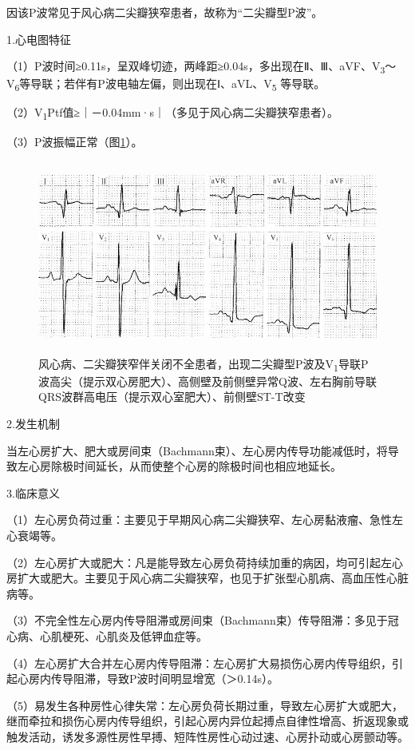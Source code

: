 因该P波常见于风心病二尖瓣狭窄患者，故称为“二尖瓣型P波”。

1.心电图特征

（1）P波时间≥0.11s，呈双峰切迹，两峰距≥0.04s，多出现在Ⅱ、Ⅲ、aVF、V\textsubscript{3}～V\textsubscript{6}等导联；若伴有P波电轴左偏，则出现在Ⅰ、aVL、V\textsubscript{5} 等导联。

（2）V\textsubscript{1}Ptf值≥｜－0.04mm·s｜（多见于风心病二尖瓣狭窄患者）。

（3）P波振幅正常（图\ref{fig1-2}）。

\begin{figure}[!htbp]
 \centering
 \includegraphics[width=5.19792in,height=2.5in]{./images/Image00007.jpg}
 \captionsetup{justification=centering}
 \caption{风心病、二尖瓣狭窄伴关闭不全患者，出现二尖瓣型P波及V\textsubscript{1}导联P波高尖（提示双心房肥大）、高侧壁及前侧壁异常Q波、左右胸前导联QRS波群高电压（提示双心室肥大）、前侧壁ST-T改变}
 \label{fig1-2}
  \end{figure} 


2.发生机制

当左心房扩大、肥大或房间束（Bachmann束）、左心房内传导功能减低时，将导致左心房除极时间延长，从而使整个心房的除极时间也相应地延长。

3.临床意义

（1）左心房负荷过重：主要见于早期风心病二尖瓣狭窄、左心房黏液瘤、急性左心衰竭等。

（2）左心房扩大或肥大：凡是能导致左心房负荷持续加重的病因，均可引起左心房扩大或肥大。主要见于风心病二尖瓣狭窄，也见于扩张型心肌病、高血压性心脏病等。

（3）不完全性左心房内传导阻滞或房间束（Bachmann束）传导阻滞：多见于冠心病、心肌梗死、心肌炎及低钾血症等。

（4）左心房扩大合并左心房内传导阻滞：左心房扩大易损伤心房内传导组织，引起心房内传导阻滞，导致P波时间明显增宽（＞0.14s）。

（5）易发生各种房性心律失常：左心房负荷长期过重，导致左心房扩大或肥大，继而牵拉和损伤心房内传导组织，引起心房内异位起搏点自律性增高、折返现象或触发活动，诱发多源性房性早搏、短阵性房性心动过速、心房扑动或心房颤动等。

